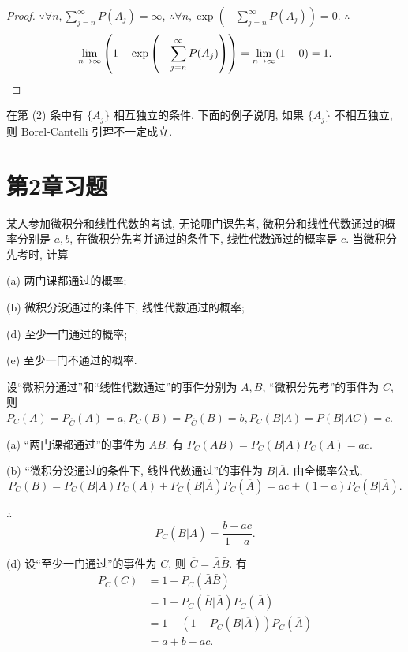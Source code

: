 \documentclass[color=black,device=normal,lang=cn]{elegantnote}
\numberwithin{equation}{section}
\theoremstyle{plain}
\newcounter{exsection}[section]
\numberwithin{exercise}{exsection}
\begin{document}
\begin{proof}
    $\because\forall n,\sum\limits_{j=n}^\infty P(A_j)=\infty$, $\therefore\forall n,\exp\left(-\sum\limits_{j=n}^\infty P(A_j)\right)=0$. $\therefore$
    \[\lim\limits_{n\to\infty}\left(1-\exp\left(-\sum\limits_{j=n}^\infty P(A_j)\right)\right)=\lim\limits_{n\to\infty}(1-0)=1.\qedhere\]
\end{proof}
在第 (2) 条中有 $\{A_j\}$ 相互独立的条件. 下面的例子说明, 如果 $\{A_j\}$ 不相互独立, 则 Borel-Cantelli 引理不一定成立.

\section{第2章习题}
\addtocounter{exsection}{2}
\addtocounter{exercise}{9}
\begin{exercise}%
    某人参加微积分和线性代数的考试, 无论哪门课先考, 微积分和线性代数通过的概率分别是 $a,b$, 在微积分先考并通过的条件下, 线性代数通过的概率是 $c$. 当微积分先考时, 计算

    (a) 两门课都通过的概率;

    (b) 微积分没通过的条件下, 线性代数通过的概率;

    (d) 至少一门通过的概率;

    (e) 至少一门不通过的概率.
\end{exercise}
\begin{solution}
    设``微积分通过''和``线性代数通过''的事件分别为 $A,B$, ``微积分先考''的事件为 $C$, 则 $P_C(A)=P_{\overline{C}}(A)=a,P_C(B)=P_{\overline{C}}(B)=b,P_C(B|A)=P(B|AC)=c$.

    (a) ``两门课都通过''的事件为 $AB$. 有 $P_C(AB)=P_C(B|A)P_C(A)=ac$.

    (b) ``微积分没通过的条件下, 线性代数通过''的事件为 $B|\overline{A}$. 由全概率公式,
    \[P_C(B)=P_C(B|A)P_C(A)+P_C(B|\overline{A})P_C(\overline{A})=ac+(1-a)P_C(B|\overline{A}).\]

    $\therefore$
    \[P_C(B|\overline{A})=\dfrac{b-ac}{1-a}.\]

    (d) 设``至少一门通过''的事件为 $C$, 则 $\overline{C}=\bar{A}\bar{B}$. 有
    \begin{align*}
        P_C(C) & =1-P_C(\bar{A}\bar{B}) \\
        & =1-P_C(\overline{B}|\overline{A})P_C(\overline{A}) \\
        & =1-(1-P_C(B|\overline{A}))P_C(\overline{A}) \\
        & =a+b-ac.
    \end{align*}
\end{solution}
\end{document}
